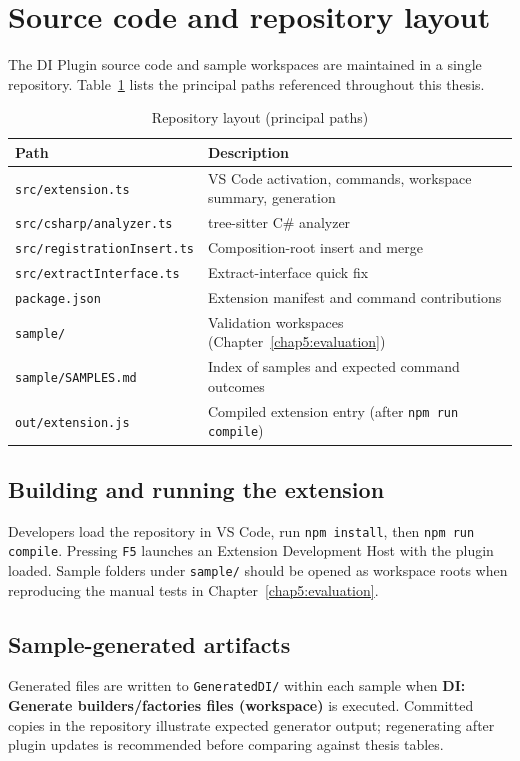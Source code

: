\chapter*{Source code and repository layout}
\label{appendix:sourcecode}

The DI Plugin source code and sample workspaces are maintained in a single repository. Table~\ref{tab:repo-layout} lists the principal paths referenced throughout this thesis.

\begin{table}[htbp]
\centering
\caption{Repository layout (principal paths)}
\label{tab:repo-layout}
\small
\begin{tabular}{|l|p{9.5cm}|}
\hline
\textbf{Path} & \textbf{Description} \\
\hline
\texttt{src/extension.ts} & VS Code activation, commands, workspace summary, generation \\
\hline
\texttt{src/csharp/analyzer.ts} & tree-sitter C\# analyzer \\
\hline
\texttt{src/registrationInsert.ts} & Composition-root insert and merge \\
\hline
\texttt{src/extractInterface.ts} & Extract-interface quick fix \\
\hline
\texttt{package.json} & Extension manifest and command contributions \\
\hline
\texttt{sample/} & Validation workspaces (Chapter~\ref{chap5:evaluation}) \\
\hline
\texttt{sample/SAMPLES.md} & Index of samples and expected command outcomes \\
\hline
\texttt{out/extension.js} & Compiled extension entry (after \texttt{npm run compile}) \\
\hline
\end{tabular}
\end{table}

\section{Building and running the extension}

Developers load the repository in VS Code, run \texttt{npm install}, then \texttt{npm run compile}. Pressing \texttt{F5} launches an Extension Development Host with the plugin loaded. Sample folders under \texttt{sample/} should be opened as workspace roots when reproducing the manual tests in Chapter~\ref{chap5:evaluation}.

\section{Sample-generated artifacts}

Generated files are written to \texttt{GeneratedDI/} within each sample when \textbf{DI: Generate builders/factories files (workspace)} is executed. Committed copies in the repository illustrate expected generator output; regenerating after plugin updates is recommended before comparing against thesis tables.
